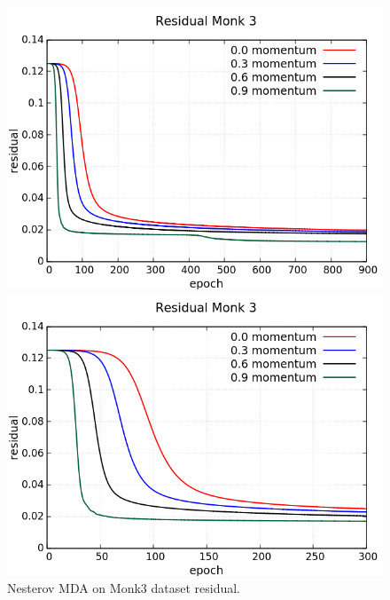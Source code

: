 \begin{figure}[H]
	\centering
	\begin{minipage}[t]{0.5\linewidth}
		\includegraphics[width=\linewidth]{data/MGD/Monk3/NM/Monk3_NMGD_Residual_standard.png}
	\end{minipage}%
	\begin{minipage}[t]{0.5\linewidth}
		\includegraphics[width=\linewidth]{data/MGD/Monk3/NM/Monk3_NMGD_Residual_zoom.png}
	\end{minipage}
	\caption{Nesterov MDA on Monk3 dataset residual.}
\end{figure}

